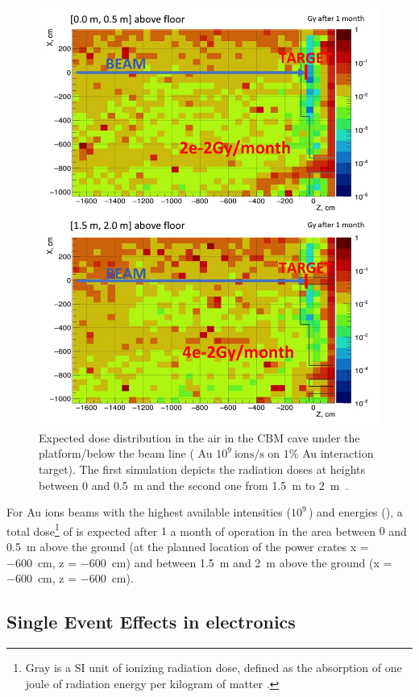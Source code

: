 \begin{figure}[!h]
    \centering
    \includegraphics[width=0.7\columnwidth]{Chapter4/images/Dose00.jpg}
    \caption{Expected dose distribution in the air in the \gls{CBM}
cave under the platform/below the beam line  ( Au $10^{9} \mathrm{\ ions/s}$ on $1$\% Au
interaction target). The first simulation depicts the radiation doses at heights between 0 and \SI{0.5}{\metre} and the second one from \SI{1.5}{\metre} to \SI{2}{\metre}~\cite{fluka_senger}.} 
    \label{fig:mCBM}
\end{figure}
For Au ions beams with the highest available intensities 
($10^{9}\,$\ionss) and energies 
(), a total dose\footnote{Gray is a SI unit of ionizing radiation dose, defined as the absorption of one joule of radiation energy per kilogram of matter \cite{gray}.} of  is expected after $1$ a month of operation in the area between $0$ and \SI{0.5}{\metre} above the ground (at the planned location of the power crates x = \SI{-600}{\centi\metre}, z = \SI{-600}{\centi\metre}) and  between \SI{1.5}{\metre} and \SI{2}{\metre} above the ground (x = \SI{-600}{\centi\metre}, z = \SI{-600}{\centi\metre}).
 


\subsection{Single Event Effects in electronics}

